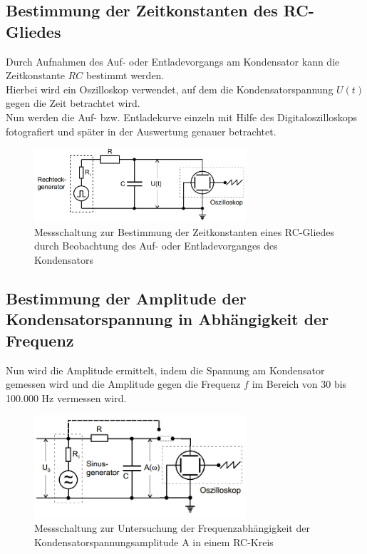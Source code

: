 \subsection{Bestimmung der Zeitkonstanten des RC-Gliedes}
Durch Aufnahmen des Auf- oder Entladevorgangs am Kondensator kann
die Zeitkonstante $RC$ bestimmt werden.\\
Hierbei wird ein Oszilloskop verwendet, auf dem die Kondensatorspannung $U(t)$ gegen die Zeit betrachtet wird. \\
Nun werden die Auf- bzw. Entladekurve einzeln mit Hilfe des Digitaloszilloskops fotografiert und später in der Auswertung genauer betrachtet.
\begin{figure}[h]
  \centering
  \includegraphics[width=0.7\textwidth]{Grafiken/V353_Abb1.jpg}
  \caption{Messschaltung zur Bestimmung der Zeitkonstanten eines RC-Gliedes durch Beobachtung des 
  Auf- oder Entladevorganges des Kondensators }
  \label{fig:V353_Abb1}
\end{figure}
\subsection{Bestimmung der Amplitude der Kondensatorspannung in Abhängigkeit der Frequenz}

Nun wird die Amplitude ermittelt, indem die Spannung am Kondensator gemessen wird und die Amplitude gegen die Frequenz $f$ im Bereich von 30 bis 100.000 Hz vermessen wird.
\begin{figure}[h]
  \centering
  \includegraphics[width=0.7\textwidth]{Grafiken/V353_Abb2.jpg}
  \caption{Messschaltung zur Untersuchung der Frequenzabhängigkeit der Kondensatorspannungsamplitude A in einem RC-Kreis}
  \label{fig:V353_Abb2}
\end{figure}
